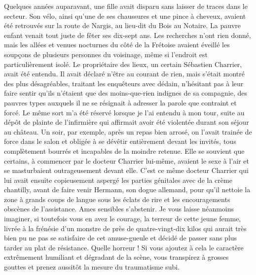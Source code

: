 Quelques années auparavant, une fille avait disparu sans laisser de traces dans le secteur. Son vélo, ainsi qu’une de ses chaussures et une pince à cheveux, avaient été retrouvés sur la route de Nargis, au lieu-dit du Bois au Notaire. La pauvre enfant venait tout juste de fêter ses dix-sept ans. Les recherches n’ont rien donné, mais les allées et venues nocturnes du côté de la Frétoise avaient éveillé les soupçons de plusieurs personnes du voisinage, même si l’endroit est particulièrement isolé. Le propriétaire des lieux, un certain Sébastien Charrier, avait été entendu. Il avait déclaré n’être au courant de rien, mais s’était montré des plus désagréables, traitant les enquêteurs avec dédain, n’hésitant pas à leur faire sentir qu’ils n’étaient que des moins-que-rien indignes de sa compagnie, des pauvres types auxquels il ne se résignait à adresser la parole que contraint et forcé. Le même sort m’a été réservé lorsque je l’ai entendu à mon tour, suite au dépôt de plainte de l’infirmière qui affirmait avoir été violentée durant son séjour au château. Un soir, par exemple, après un repas bien arrosé, on l’avait trainée de force dans le salon et obligée à se dévêtir entièrement devant les invités, tous complètement bourrés et incapables de la moindre retenue. Elle se souvient que certains, à commencer par le docteur Charrier lui-même, avaient le sexe à l’air et se masturbaient outrageusement devant elle. C’est ce même docteur Charrier qui lui avait ensuite copieusement aspergé les parties génitales avec de la crème chantilly, avant de faire venir Hermann, son dogue allemand, pour qu’il nettoie la zone à grands coups de langue sous les éclats de rire et les encouragements obscènes de l’assistance. Ames sensibles s’abstenir. Je vous laisse néanmoins imaginer, si toutefois vous en avez le courage, la terreur de cette jeune femme, livrée à la frénésie d’un monstre de près de quatre-vingt-dix kilos qui aurait très bien pu ne pas se satisfaire de cet amuse-gueule et décidé de passer sans plus tarder au plat de résistance. Quelle horreur ! Si vous ajoutez à cela le caractère extrêmement humiliant et dégradant de la scène, vous transpirez à grosses gouttes et prenez aussitôt la mesure du traumatisme subi.

